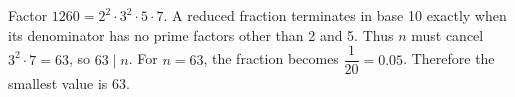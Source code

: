 Factor $1260=2^2\cdot3^2\cdot5\cdot7$. A reduced fraction terminates in base 10 exactly when its denominator has no prime factors other than 2 and 5. Thus $n$ must cancel $3^2\cdot7=63$, so $63\mid n$. For $n=63$, the fraction becomes $\dfrac{1}{20}=0.05$. Therefore the smallest value is $\boxed{63}$.
